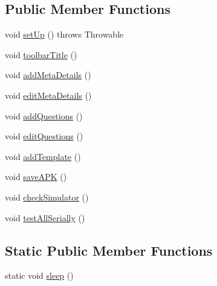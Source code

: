 \subsection*{Public Member Functions}
\begin{DoxyCompactItemize}
\item 
void \hyperlink{classorg_1_1buildmlearn_1_1toolkit_1_1espresso_1_1ComprehensionTest_acbc7fab5019200bc8ce9443a5af39adc}{set\+Up} ()  throws Throwable 
\item 
void \hyperlink{classorg_1_1buildmlearn_1_1toolkit_1_1espresso_1_1ComprehensionTest_a950cf39e4cb71d7af2fe61ca5639b3d7}{toolbar\+Title} ()
\item 
void \hyperlink{classorg_1_1buildmlearn_1_1toolkit_1_1espresso_1_1ComprehensionTest_ae7ef87b818c95894432be51bdd3bc499}{add\+Meta\+Details} ()
\item 
void \hyperlink{classorg_1_1buildmlearn_1_1toolkit_1_1espresso_1_1ComprehensionTest_a060cb4ffebf7c9dded52114250a3658b}{edit\+Meta\+Details} ()
\item 
void \hyperlink{classorg_1_1buildmlearn_1_1toolkit_1_1espresso_1_1ComprehensionTest_a36d21a5e0c0d7c5e76a3121cca8d8658}{add\+Questions} ()
\item 
void \hyperlink{classorg_1_1buildmlearn_1_1toolkit_1_1espresso_1_1ComprehensionTest_ae83c8565e3040270f9559c58b5659912}{edit\+Questions} ()
\item 
void \hyperlink{classorg_1_1buildmlearn_1_1toolkit_1_1espresso_1_1ComprehensionTest_a2a125d188e72d4a40c97b7641e76fba3}{add\+Template} ()
\item 
void \hyperlink{classorg_1_1buildmlearn_1_1toolkit_1_1espresso_1_1ComprehensionTest_af1ab73b0eb157d71cbb3c154ac748226}{save\+A\+PK} ()
\item 
void \hyperlink{classorg_1_1buildmlearn_1_1toolkit_1_1espresso_1_1ComprehensionTest_a83a15e3e0201f33044ddb530f2addbbb}{check\+Simulator} ()
\item 
void \hyperlink{classorg_1_1buildmlearn_1_1toolkit_1_1espresso_1_1ComprehensionTest_ac1856cbecc6105ed5d27b6c9dedd021a}{test\+All\+Serially} ()
\end{DoxyCompactItemize}
\subsection*{Static Public Member Functions}
\begin{DoxyCompactItemize}
\item 
static void \hyperlink{classorg_1_1buildmlearn_1_1toolkit_1_1espresso_1_1ComprehensionTest_a9674f0e1a8aae9685e61a6b8d3d3c9ff}{sleep} ()
\end{DoxyCompactItemize}
